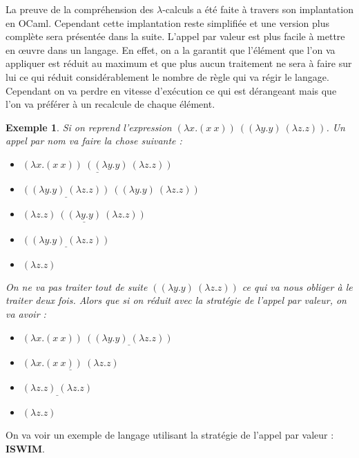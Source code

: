 \documentclass[10pt,a4paper]{report}
\newtheorem{ex}{Exemple}
\begin{document}
	La preuve de la compréhension des $\lambda$-calculs a été faite à travers son implantation en OCaml. Cependant cette implantation reste simplifiée et une version plus complète sera présentée dans la suite. 
	\smallbreak
	L'appel par valeur est plus facile à mettre en \oe{uvre} dans un langage. En effet, on a la garantit que l'élément que l'on va appliquer est réduit au maximum et que plus aucun traitement ne sera à faire sur lui ce qui réduit considérablement le nombre de règle qui va régir le langage. Cependant on va perdre en vitesse d'exécution ce qui est dérangeant mais que l'on va préférer à un recalcule de chaque élément.
	\begin{ex}
		Si on reprend l'expression $(\lambda x.(x~x))~((\lambda y.y)~(\lambda z.z))$. Un appel par nom va faire la chose suivante :
		\begin{itemize}
			\item[] $\underline{(\lambda x.(x~x))~((\lambda y.y)~(\lambda z.z))}$
			\item[$\rightarrow_{n}^{\beta}$] $\underline{((\lambda y.y)~(\lambda z.z))}~((\lambda y.y)~(\lambda z.z))$
			\item[$\rightarrow_{n}^{\beta}$] $\underline{(\lambda z.z)~((\lambda y.y)~(\lambda z.z))}$
			\item[$\rightarrow_{n}^{\beta}$] $\underline{((\lambda y.y)~(\lambda z.z))}$
			\item[$\rightarrow_{n}^{\beta}$] $(\lambda z.z)$
		\end{itemize}
		\medbreak
		
		On ne va pas traiter tout de suite $((\lambda y.y)~(\lambda z.z))$ ce qui va nous obliger à le traiter deux fois. Alors que si on réduit avec la stratégie de l'appel par valeur, on va avoir :
		\begin{itemize}
			\item[] $(\lambda x.(x~x))~\underline{((\lambda y.y)~(\lambda z.z))}$
			\item[$\rightarrow_{n}^{\beta}$] $\underline{(\lambda x.(x~x))~(\lambda z.z)}$
			\item[$\rightarrow_{n}^{\beta}$] $\underline{(\lambda z.z)~(\lambda z.z)}$
			\item[$\rightarrow_{n}^{\beta}$] $(\lambda z.z)$
		\end{itemize}
	\end{ex} 
	\bigbreak
	
	
	On va voir un exemple de langage utilisant la stratégie de l'appel par valeur : \textbf{ISWIM}.
	\newpage
	
\end{document}
